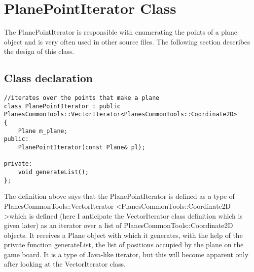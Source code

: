 \section{PlanePointIterator Class}

The PlanePointIterator is responsible with enumerating the points of a plane object and is very often used in other source files. The following section describes the design of this class.

\subsection {Class declaration} 

\begin{lstlisting} 
//iterates over the points that make a plane
class PlanePointIterator : public PlanesCommonTools::VectorIterator<PlanesCommonTools::Coordinate2D>
{
    Plane m_plane;
public:
    PlanePointIterator(const Plane& pl);

private:
    void generateList();
};
\end{lstlisting}

The definition above says that the PlanePointIterator is defined as a type of PlanesCommonTools::VectorIterator \textless PlanesCommonTools::Coordinate2D \textgreater which is defined (here I anticipate the VectorIterator class definition which is given later) as an iterator over a list of PlanesCommonTools::Coordinate2D objects. It receives a Plane object with which it generates, with the help of the private function generateList, the list of positions occupied by the plane on the game board. It is a type of Java-like iterator, but this will become apparent only after looking at the VectorIterator class. 

